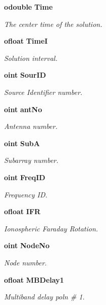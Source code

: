 \begin{CompactItemize}
{\bf odouble} {\bf Time}
\begin{CompactList}\small\item\em The center time of the solution. \item\end{CompactList}\item 
{\bf ofloat} {\bf Time\-I}
\begin{CompactList}\small\item\em Solution interval. \item\end{CompactList}\item 
{\bf oint} {\bf Sour\-ID}
\begin{CompactList}\small\item\em Source Identifier number. \item\end{CompactList}\item 
{\bf oint} {\bf ant\-No}
\begin{CompactList}\small\item\em Antenna number. \item\end{CompactList}\item 
{\bf oint} {\bf Sub\-A}
\begin{CompactList}\small\item\em Subarray number. \item\end{CompactList}\item 
{\bf oint} {\bf Freq\-ID}
\begin{CompactList}\small\item\em Frequency ID. \item\end{CompactList}\item 
{\bf ofloat} {\bf IFR}
\begin{CompactList}\small\item\em Ionospheric Faraday Rotation. \item\end{CompactList}\item 
{\bf oint} {\bf Node\-No}
\begin{CompactList}\small\item\em Node number. \item\end{CompactList}\item 
{\bf ofloat} {\bf MBDelay1}
\begin{CompactList}\small\item\em Multiband delay poln \# 1. \item\end{CompactList}\item 

\end{CompactItemize}
